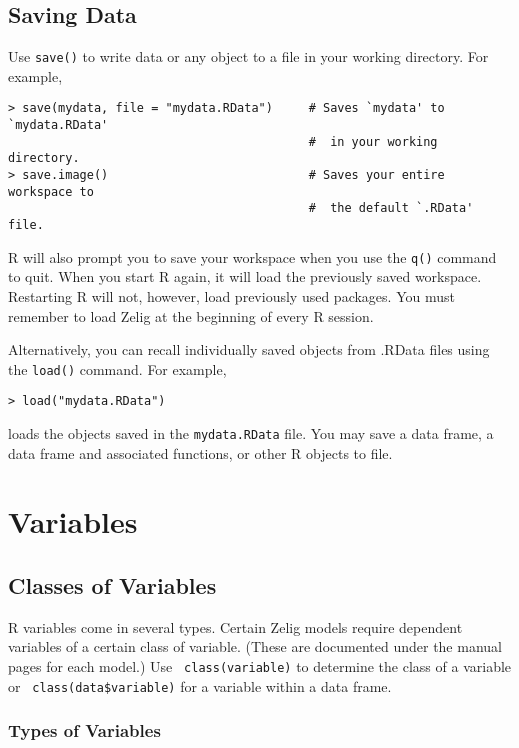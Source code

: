 \subsection{Saving Data}\label{s:save}

Use \texttt{save()} to write data or any object to a file in your
working directory.  For example,
\begin{verbatim}
> save(mydata, file = "mydata.RData")     # Saves `mydata' to `mydata.RData'
                                          #  in your working directory.  
> save.image()                            # Saves your entire workspace to
                                          #  the default `.RData' file.
\end{verbatim}
R will also prompt you to save your workspace when you use the
\texttt{q()} command to quit.  When you start R again, it will load
the previously saved workspace.  Restarting R will not, however, load
previously used packages.  You must remember to load Zelig at the
beginning of every R session.

Alternatively, you can recall individually saved objects from .RData
files using the {\tt load()} command.  For example,
\begin{verbatim}
> load("mydata.RData") 
\end{verbatim}
loads the objects saved in the {\tt mydata.RData} file.  You may save
a data frame, a data frame and associated functions, or other R
objects to file.

\section{Variables}

\subsection{Classes of Variables}

R variables come in several types.  Certain Zelig models require
dependent variables of a certain class of variable.  (These are
documented under the manual pages for each model.)  Use {\tt
  class(variable)} to determine the class of a variable or {\tt
  class(data\$variable)} for a variable within a data frame.  %

\subsubsection*{Types of Variables} \label{variable.classes}

